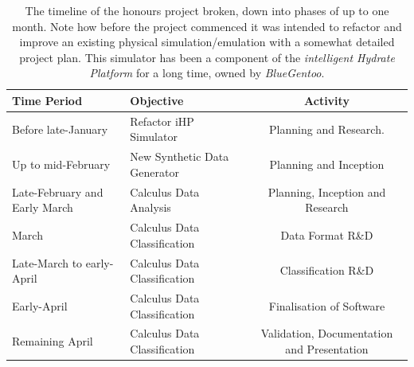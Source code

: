 \documentclass[main.tex]{subfiles}
\begin{document}
    \begin{table}[h]
      \centering
      \caption{The timeline of the honours project broken, down into phases of up to one month. Note how before the project commenced it was intended to refactor and improve an existing physical simulation/emulation with a somewhat detailed project plan. This simulator has been a component of the \textit{intelligent Hydrate Platform} for a long time, owned by \textit{BlueGentoo}.}
      \begin{tabularx}{\linewidth}{ X | X c }
        \hline
        Time Period & Objective & Activity \\
        \hline \hline
        Before late-January & Refactor iHP Simulator & Planning and Research. \\ \hline
        Up to mid-February & New Synthetic Data Generator & Planning and Inception \\ \hline
        Late-February and Early March & Calculus Data Analysis & Planning, Inception and Research \\ \hline
        March & Calculus Data Classification & Data Format R\&D \\ \hline
        Late-March to early-April & Calculus Data Classification & Classification R\&D \\ \hline
        Early-April & Calculus Data Classification & Finalisation of Software \\ \hline   
        Remaining April & Calculus Data Classification & Validation, Documentation and Presentation \\ \hline
        \hline
      \end{tabularx}
      \label{tbl:timeline}
    \end{table} 
  
\end{document}

